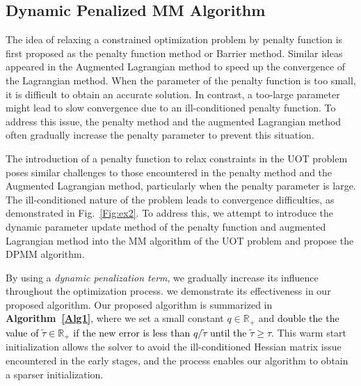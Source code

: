 \documentclass[conference]{IEEEtran}
\newcommand{\R}{\mathbb{R}}
\newcommand{\changeSX}[1]{\textcolor{black}{#1}}
\begin{document}
\subsection{Dynamic Penalized MM Algorithm}
The idea of relaxing a constrained optimization problem by penalty function is first proposed as the penalty function method or Barrier method. Similar ideas appeared in the Augmented Lagrangian method to speed up the convergence of the Lagrangian method. When the parameter of the penalty function is too small, it is difficult to obtain an accurate solution. In contrast, a too-large parameter might lead to slow convergence due to an ill-conditioned penalty function. To address this issue, the penalty method \cite{349995, adaptive_p} and the augmented Lagrangian method \cite{doi:10.1137/1.9781611973365} often gradually increase the penalty parameter to prevent this situation.

The introduction of a penalty function to relax constraints in the UOT problem poses similar challenges to those encountered in the penalty method and the Augmented Lagrangian method, particularly when the penalty parameter is large. The ill-conditioned nature of the problem leads to convergence difficulties, as demonstrated in Fig.~\ref{Fig:ex2}. To address this, we attempt to introduce the dynamic parameter update method of the penalty function and augmented Lagrangian method into the MM algorithm of the UOT problem and propose the DPMM algorithm.

By using a {\it dynamic penalization term}, we gradually increase its influence throughout the optimization process. we demonstrate its effectiveness in our proposed algorithm. Our proposed algorithm is summarized in {\bf Algorithm~\ref{Alg1}}, where we set a small constant $q \in \R_+ $ and \changeSX{double the the value of $\tilde{\tau}\in \R_+$ if the new error is less than $q/\tilde{\tau}$ until the $\tilde{\tau} \geq \tau$}. This warm start initialization allows the solver to avoid the ill-conditioned Hessian matrix issue encountered in the early stages, and the process enables our algorithm to obtain a sparser initialization.
\end{document}
